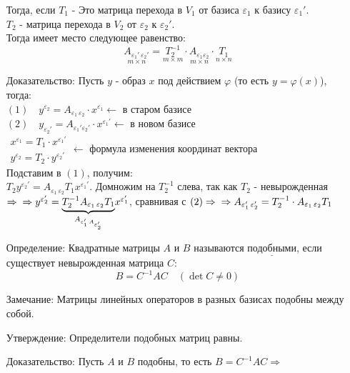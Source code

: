 \documentclass[12pt, letterpaper, twoside]{article}
\newcommand{\Underl}[1]{$\underline{\text{#1}}$}
\begin{document}
\begin{enumerate}
            Тогда, если $T_1$ - Это матрица перехода в $V_1$ от базиса $\varepsilon_1$ к базису $\varepsilon_1'$.\\
            $T_2$ - матрица перехода в $V_2$ от $\varepsilon_2$ к $\varepsilon_2'$.\\
            Тогда имеет место следующее равенство:
            \[\underset{m\times n}{A_{\varepsilon_1'\, \varepsilon_2'}} = \underset{m\times m}{T_2^{-1}}\cdot \underset{m\times n}{A_{\varepsilon_1 \varepsilon_2}}\cdot \underset{n\times n}{T_1}\]
            \item[Доказательство:] Пусть $y$ - образ $x$ под действием $\varphi$ \big(то есть $y = \varphi(x)$\big), тогда:\\
            $(1)\quad y^{\varepsilon_2} = A_{\varepsilon_1\, \varepsilon_2} \cdot x^{\varepsilon_1}\leftarrow$ в старом базисе\\
            $(2)\quad y_{\varepsilon_2'} = A_{\varepsilon_1' \varepsilon_2'}\cdot x^{\varepsilon_1'}\leftarrow$ в новом базисе\\
            $\begin{matrix}
                x^{\varepsilon_1} = T_1\cdot x^{\varepsilon_1'}\\
                y^{\varepsilon_2} = T_2\cdot y^{\varepsilon_2'}
            \end{matrix}\leftarrow$ формула изменения координат вектора\\
            Подставим в $(1)$, получим:\\
            $T_2 y^{\varepsilon_2'} = A_{\varepsilon_1\, \varepsilon_2}T_1 x^{\varepsilon_1'}$. Домножим на $T_2^{-1}$ слева, так как $T_2$ - невырожденная$\Rightarrow\\
            \Rightarrow y^{\varepsilon_2'} = \underset{A_{\varepsilon_1'\, A_{\varepsilon_2'}}}{\underbrace{T_2^{-1} A_{\varepsilon_1\, \varepsilon_2} T_1}} x^{\varepsilon_1'}$, сравнивая с $(2)\Rightarrow\\
            \Rightarrow A_{\varepsilon_1'\, \varepsilon_2'} = T_2^{-1}\cdot A_{\varepsilon_1\, \varepsilon_2} T_1$
            \item[Определение:] Квадратные матрицы $A$ и $B$ называются \Underl{подобными}, если существует невырожденная матрица $C$:
            \[B = C^{-1}AC\quad (\det C\neq 0)\] 
            \item[Замечание:] Матрицы линейных операторов в разных базисах подобны между собой.
            \item[Утверждение:] Определители подобных матриц равны.
            \item[Доказательство:] Пусть $A$ и $B$ подобны, то есть $B = C^{-1}AC\Rightarrow$
        \end{enumerate}
\end{document}
